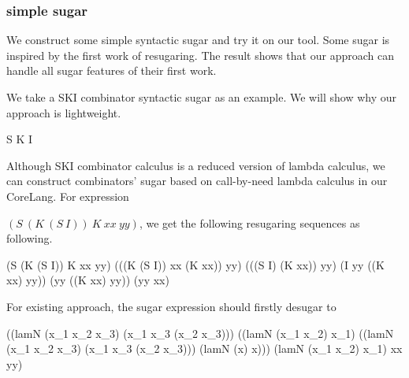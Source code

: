 \subsubsection{simple sugar}
\label{mark:simple}

We construct some simple syntactic sugar and try it on our tool. Some sugar is inspired by the first work of resugaring\cite{resugaring}. The result shows that our approach can handle all sugar features of their first work.

We take a SKI combinator syntactic sugar as an example. We will show why our approach is lightweight.
\begin{Codes}
	S 
	K 
	I 
\end{Codes}



Although SKI combinator calculus is a reduced version of lambda calculus, we can construct combinators' sugar based on call-by-need lambda calculus in our CoreLang. For expression

 $(S~(K~(S~I))~K~xx~yy)$, we get the following resugaring sequences as following.
\begin{Codes}
    (S (K (S I)) K xx yy)
\CoreStep (((K (S I)) xx (K xx)) yy)
\CoreStep (((S I) (K xx)) yy)
\CoreStep (I yy ((K xx) yy))
\CoreStep (yy ((K xx) yy))
\CoreStep (yy xx)
\end{Codes}

For existing approach, the sugar expression should firstly desugar to
\begin{Codes}
((lamN
   (x_{1} x_{2} x_{3})
   (x_{1} x_{3} (x_{2} x_{3})))
  ((lamN (x_{1} x_{2}) x_{1})
   ((lamN
     (x_{1} x_{2} x_{3})
     (x_{1} x_{3} (x_{2} x_{3})))
    (lamN (x) x)))
  (lamN (x_{1} x_{2}) x_{1})
  xx yy)
\end{Codes}

